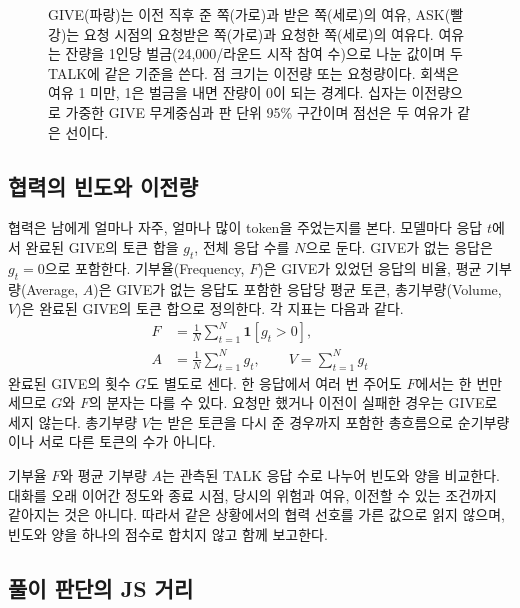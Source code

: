 \begin{figure}[t]
\centering
\resizebox{\textwidth}{!}{}
\caption{GIVE(파랑)는 이전 직후 준 쪽(가로)과 받은 쪽(세로)의 여유, ASK(빨강)는 요청 시점의 요청받은 쪽(가로)과 요청한 쪽(세로)의 여유다. 여유는 잔량을 1인당 벌금(24,000/라운드 시작 참여 수)으로 나눈 값이며 두 TALK에 같은 기준을 쓴다. 점 크기는 이전량 또는 요청량이다. 회색은 여유 1 미만, 1은 벌금을 내면 잔량이 0이 되는 경계다. 십자는 이전량으로 가중한 GIVE 무게중심과 판 단위 95\% 구간이며 점선은 두 여유가 같은 선이다.}
\label{fig:arena-gifts}
\end{figure}


\subsection{협력의 빈도와 이전량}\label{sec:cooperation}

협력은 남에게 얼마나 자주, 얼마나 많이 token을 주었는지를 본다. 모델마다 응답 $t$에서 완료된 GIVE의 토큰 합을 $g_t$, 전체 응답 수를 $N$으로 둔다. GIVE가 없는 응답은 $g_t=0$으로 포함한다. 기부율(Frequency, $F$)은 GIVE가 있었던 응답의 비율, 평균 기부량(Average, $A$)은 GIVE가 없는 응답도 포함한 응답당 평균 토큰, 총기부량(Volume, $V$)은 완료된 GIVE의 토큰 합으로 정의한다. 각 지표는 다음과 같다.
\begin{equation}
\begin{aligned}
F&=\frac{1}{N}\sum_{t=1}^{N}\mathbf{1}[g_t>0],\\
A&=\frac{1}{N}\sum_{t=1}^{N}g_t,\qquad V=\sum_{t=1}^{N}g_t
\end{aligned}
\label{eq:cooperation}
\end{equation}
완료된 GIVE의 횟수 $G$도 별도로 센다. 한 응답에서 여러 번 주어도 $F$에서는 한 번만 세므로 $G$와 $F$의 분자는 다를 수 있다. 요청만 했거나 이전이 실패한 경우는 GIVE로 세지 않는다. 총기부량 $V$는 받은 토큰을 다시 준 경우까지 포함한 총흐름으로 순기부량이나 서로 다른 토큰의 수가 아니다.

기부율 $F$와 평균 기부량 $A$는 관측된 TALK 응답 수로 나누어 빈도와 양을 비교한다. 대화를 오래 이어간 정도와 종료 시점, 당시의 위험과 여유, 이전할 수 있는 조건까지 같아지는 것은 아니다. 따라서 같은 상황에서의 협력 선호를 가른 값으로 읽지 않으며, 빈도와 양을 하나의 점수로 합치지 않고 함께 보고한다.

\subsection{풀이 판단의 JS 거리}

